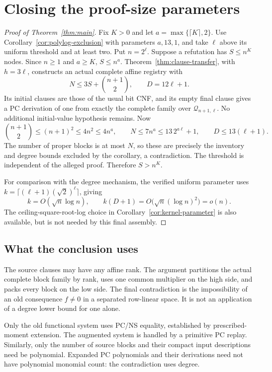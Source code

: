 \section{Closing the proof-size parameters}\label{sec:main-proof}

\begin{proof}[Proof of Theorem~\ref{thm:main}]
Fix \(K>0\) and let \(a=\max\{\lceil K\rceil,2\}\).
Use Corollary~\ref{cor:polylog-exclusion} with parameters \(a,13,1\),
and take \(\ell\) above its uniform threshold and at least two.
Put \(n=2^\ell\). Suppose a refutation has \(S\le n^K\) nodes.
Since \(n\ge1\) and \(a\ge K\), \(S\le n^a\).
Theorem~\ref{thm:clause-transfer}, with \(h=3\ell\), constructs an actual
complete affine registry with
\[
 N\le3S+\binom{n+1}{2},\qquad D=12\ell+1.
\]
Its initial clauses are those of the usual bit CNF, and its empty final
clause gives a PC derivation of one from exactly the complete family over
\(\mathcal Q_{n+1,\ell}\). No additional initial-value hypothesis remains.
Now
\[
 \binom{n+1}{2}\le(n+1)^2\le4n^2\le4n^a,
 \qquad N\le7n^a\le13\,2^{a\ell}+1,
 \qquad D\le13(\ell+1).
\]
The number of proper blocks is at most \(N\), so these are precisely the
inventory and degree bounds excluded by the corollary, a contradiction.
The threshold is independent of the alleged proof. Therefore \(S>n^K\).

For comparison with the degree mechanism, the verified uniform parameter
uses \(k=\lceil(\ell+1)(\sqrt2)^\ell\rceil\), giving
\begin{equation}\label{eq:main-asymptotics}
 k=O(\sqrt n\log n),\qquad
 k(D+1)=O\bigl(\sqrt n(\log n)^2\bigr)=o(n).
\end{equation}
The ceiling-square-root-log choice in Corollary~\ref{cor:kernel-parameter}
is also available, but is not needed by this final assembly.
\end{proof}

\subsection{What the conclusion uses}
The source clauses may have any affine rank. The argument partitions
the actual complete block family by rank, uses one common multiplier
on the high side, and packs every block on the low side.
The final contradiction is the impossibility of an old consequence
\(f\ne0\) in a separated row-linear space. It is not an application
of a degree lower bound for one alone.

Only the old functional system uses PC/NS equality, established by
prescribed-moment extension. The augmented system is handled by a
primitive PC replay. Similarly, only the number of source blocks and
their compact input descriptions need be polynomial. Expanded PC
polynomials and their derivations need not have polynomial monomial
count: the contradiction uses degree.

